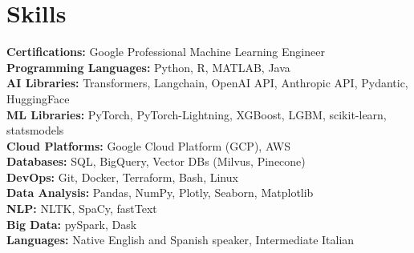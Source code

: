 \documentclass[a4paper,11pt]{article}
\begin{document}
\vspace{-0.3cm}

\section{\textbf{Skills}}
 \begin{itemize}[leftmargin=0.15in, label={}]
    {\item{
    \textbf{Certifications:} Google Professional Machine Learning Engineer \\
     \textbf{Programming Languages:} Python, R, MATLAB, Java \\
     \textbf{AI Libraries:} Transformers, Langchain, OpenAI API, Anthropic API, Pydantic, HuggingFace \\
     \textbf{ML Libraries:} PyTorch, PyTorch-Lightning, XGBoost, LGBM, scikit-learn, statsmodels \\
     \textbf{Cloud Platforms:} Google Cloud Platform (GCP), AWS \\
     \textbf{Databases:} SQL, BigQuery, Vector DBs (Milvus, Pinecone) \\
     \textbf{DevOps:} Git, Docker, Terraform, Bash, Linux \\
     \textbf{Data Analysis:} Pandas, NumPy, Plotly, Seaborn, Matplotlib \\
     \textbf{NLP:} NLTK, SpaCy, fastText \\
     \textbf{Big Data:} pySpark, Dask \\
     \textbf{Languages:} Native English and Spanish speaker, Intermediate Italian
    }}
 \end{itemize}
\end{document}
